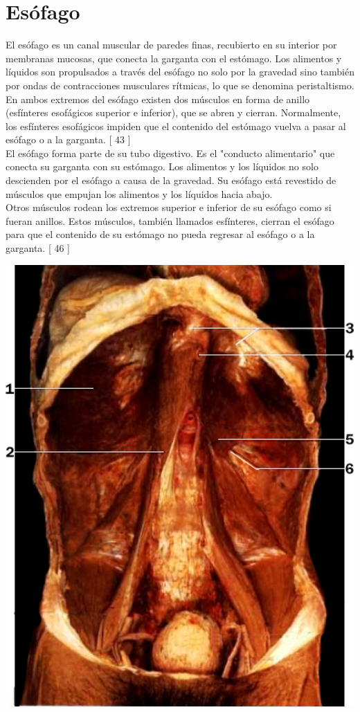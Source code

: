 \section{Esófago}
El esófago es un canal muscular de paredes finas, recubierto en su interior por membranas mucosas, que conecta la garganta con el estómago. Los alimentos 
y líquidos son propulsados a través del esófago no solo por la gravedad sino también por ondas de contracciones musculares rítmicas, lo que se denomina peristaltismo. 
En ambos extremos del esófago existen dos músculos en forma de anillo (esfínteres esofágicos superior e inferior), que se abren y cierran. Normalmente, los esfínteres 
esofágicos impiden que el contenido del estómago vuelva a pasar al esófago o a la garganta. [ 43 ]\\
El esófago forma parte de su tubo digestivo. Es el "conducto alimentario" que conecta su garganta con su estómago. Los alimentos y los líquidos no solo descienden por 
el esófago a causa de la gravedad. Su esófago está revestido de músculos que empujan los alimentos y los líquidos hacia abajo.\\
Otros músculos rodean los extremos superior e inferior de su esófago como si fueran anillos. Estos músculos, también llamados esfínteres, cierran el esófago para que 
el contenido de su estómago no pueda regresar al esófago o a la garganta. [ 46 ]\\
	\begin{center}
 		\includegraphics[width = 1\textwidth]{v2/images/image39.png}
	\end{center} 
